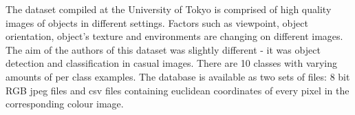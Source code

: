 	The dataset compiled at the University of Tokyo is comprised of high quality images of objects in different settings. Factors such as viewpoint, object orientation, object's texture and environments are changing on different images. The aim of the authors of this dataset was slightly different - it was object detection and classification in casual images. There are 10 classes with varying amounts of per class examples. The database is available as two sets of files: 8 bit RGB jpeg files and csv files containing euclidean coordinates of every pixel in the corresponding colour image.


